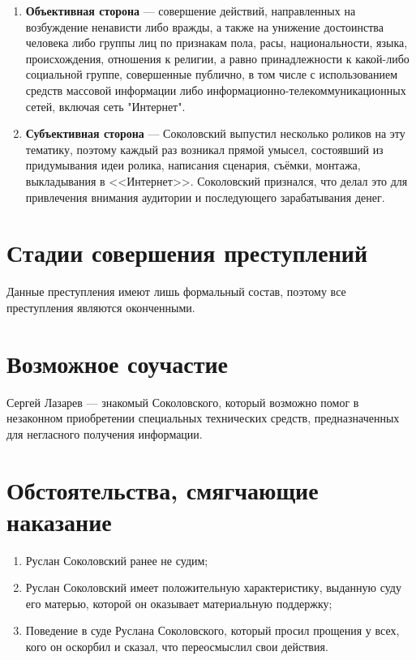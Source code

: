 \documentclass[a4paper]{article}
\begin{document}
\begin{itemize}
\begin{enumerate}
				\item \textbf{Объективная сторона} --- совершение действий, направленных на возбуждение ненависти либо вражды, а также на унижение достоинства человека либо группы лиц по признакам пола, расы, национальности, языка, происхождения, отношения к религии, а равно принадлежности к какой-либо социальной группе, совершенные публично, в том числе с использованием средств массовой информации либо информационно-телекоммуникационных сетей, включая сеть "Интернет".
				
				\item \textbf{Субъективная сторона} --- Соколовский выпустил несколько роликов на эту тематику, поэтому каждый раз возникал прямой умысел, состоявший из придумывания идеи ролика, написания сценария, съёмки, монтажа, выкладывания в <<Интернет>>. Соколовский признался, что делал это для привлечения внимания аудитории и последующего зарабатывания денег.
			\end{enumerate}

		\end{itemize}
	
	\section{Стадии совершения преступлений}
	
		Данные преступления имеют лишь формальный состав, поэтому все преступления являются оконченными.
	
	\section{Возможное соучастие}
		
		Сергей Лазарев --- знакомый Соколовского, который возможно помог в незаконном приобретении специальных технических средств, предназначенных для негласного получения информации.
		
	\section{Обстоятельства, смягчающие наказание}
		
		\begin{enumerate}
			\item Руслан Соколовский ранее не судим;
			
			\item Руслан Соколовский имеет положительную характеристику, выданную суду его матерью, которой он оказывает материальную поддержку;
			
			\item Поведение в суде Руслана Соколовского, который просил прощения у всех, кого он оскорбил и сказал, что переосмыслил свои действия.
		\end{enumerate}
		
\end{document}
